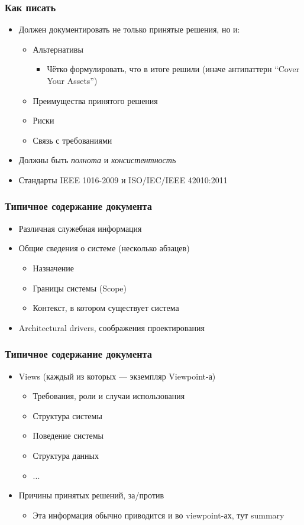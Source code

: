\documentclass[xetex,mathserif,serif]{beamer}
\begin{document}
	\begin{frame}
		\frametitle{Как писать}
		\begin{itemize}
			\item Должен документировать не только принятые решения, но и:
			\begin{itemize}
				\item Альтернативы
				\begin{itemize}
					\item Чётко формулировать, что в итоге решили (иначе антипаттерн ``Cover Your Assets'')
				\end{itemize}
				\item Преимущества принятого решения
				\item Риски
				\item Связь с требованиями
			\end{itemize}
			\item Должны быть \textit{полнота} и \textit{консистентность}
			\item Стандарты IEEE 1016-2009 и ISO/IEC/IEEE 42010:2011
		\end{itemize}
	\end{frame}

	\begin{frame}
		\frametitle{Типичное содержание документа}
		\begin{itemize}
			\item Различная служебная информация
			\item Общие сведения о системе (несколько абзацев)
			\begin{itemize}
				\item Назначение
				\item Границы системы (Scope)
				\item Контекст, в котором существует система
			\end{itemize}
			\item Architectural drivers, соображения проектирования
		\end{itemize}
	\end{frame}

	\begin{frame}
		\frametitle{Типичное содержание документа}
		\begin{itemize}
			\item Views (каждый из которых --- экземпляр Viewpoint-а)
			\begin{itemize}
				\item Требования, роли и случаи использования
				\item Структура системы
				\item Поведение системы
				\item Структура данных
				\item ...
			\end{itemize}
			\item Причины принятых решений, за/против
			\begin{itemize}
				\item Эта информация обычно приводится и во viewpoint-ах, тут summary
			\end{itemize}
		\end{itemize}
	\end{frame}
\end{document}
